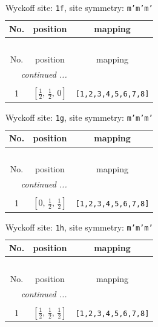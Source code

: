 \documentclass[fleqn,8pt]{jsarticle}
\begin{document}
\renewcommand{\arraystretch}{1.2}
\begin{longtable}{ccc}
\caption{Wyckoff site: {\tt 1f}, site symmetry: {\tt m'm'm'}}
 \\
 \hline \hline
No. & position & mapping \\ \hline \endfirsthead

\multicolumn{2}{l}{\tablename\ \thetable{}} \\
 \hline \hline
No. & position & mapping \\ \hline \endhead

 \hline \hline
\multicolumn{2}{r}{\footnotesize\it continued ...} \\ \endfoot

 \hline \hline
\multicolumn{2}{r}{} \\ \endlastfoot

1 & $\left[ \frac{1}{2},\, \frac{1}{2},\, 0 \right]$ & {\tt [1,2,3,4,5,6,7,8]} \\
\end{longtable}
\renewcommand{\arraystretch}{1.2}
\begin{longtable}{ccc}
\caption{Wyckoff site: {\tt 1g}, site symmetry: {\tt m'm'm'}}
 \\
 \hline \hline
No. & position & mapping \\ \hline \endfirsthead

\multicolumn{2}{l}{\tablename\ \thetable{}} \\
 \hline \hline
No. & position & mapping \\ \hline \endhead

 \hline \hline
\multicolumn{2}{r}{\footnotesize\it continued ...} \\ \endfoot

 \hline \hline
\multicolumn{2}{r}{} \\ \endlastfoot

1 & $\left[ 0,\, \frac{1}{2},\, \frac{1}{2} \right]$ & {\tt [1,2,3,4,5,6,7,8]} \\
\end{longtable}
\renewcommand{\arraystretch}{1.2}
\begin{longtable}{ccc}
\caption{Wyckoff site: {\tt 1h}, site symmetry: {\tt m'm'm'}}
 \\
 \hline \hline
No. & position & mapping \\ \hline \endfirsthead

\multicolumn{2}{l}{\tablename\ \thetable{}} \\
 \hline \hline
No. & position & mapping \\ \hline \endhead

 \hline \hline
\multicolumn{2}{r}{\footnotesize\it continued ...} \\ \endfoot

 \hline \hline
\multicolumn{2}{r}{} \\ \endlastfoot

1 & $\left[ \frac{1}{2},\, \frac{1}{2},\, \frac{1}{2} \right]$ & {\tt [1,2,3,4,5,6,7,8]} \\
\end{longtable}
\end{document}
